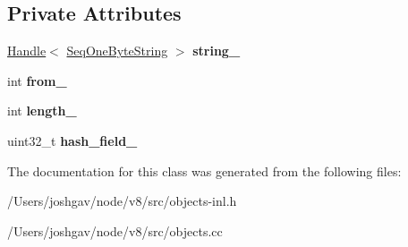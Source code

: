 \subsection*{Private Attributes}
\begin{DoxyCompactItemize}
\item 
\hyperlink{classv8_1_1internal_1_1_handle}{Handle}$<$ \hyperlink{classv8_1_1internal_1_1_seq_one_byte_string}{Seq\+One\+Byte\+String} $>$ {\bfseries string\+\_\+}\hypertarget{classv8_1_1internal_1_1_seq_one_byte_sub_string_key_a38f0b8d9a40194fb7730d05659f8129a}{}\label{classv8_1_1internal_1_1_seq_one_byte_sub_string_key_a38f0b8d9a40194fb7730d05659f8129a}

\item 
int {\bfseries from\+\_\+}\hypertarget{classv8_1_1internal_1_1_seq_one_byte_sub_string_key_aeb2345eb478bebda7102ece402c0a119}{}\label{classv8_1_1internal_1_1_seq_one_byte_sub_string_key_aeb2345eb478bebda7102ece402c0a119}

\item 
int {\bfseries length\+\_\+}\hypertarget{classv8_1_1internal_1_1_seq_one_byte_sub_string_key_a0451a59e42ffe835ab6cb6b6e355f93a}{}\label{classv8_1_1internal_1_1_seq_one_byte_sub_string_key_a0451a59e42ffe835ab6cb6b6e355f93a}

\item 
uint32\+\_\+t {\bfseries hash\+\_\+field\+\_\+}\hypertarget{classv8_1_1internal_1_1_seq_one_byte_sub_string_key_a210c86e69cec8b23b921000dd96441b4}{}\label{classv8_1_1internal_1_1_seq_one_byte_sub_string_key_a210c86e69cec8b23b921000dd96441b4}

\end{DoxyCompactItemize}


The documentation for this class was generated from the following files\+:\begin{DoxyCompactItemize}
\item 
/\+Users/joshgav/node/v8/src/objects-\/inl.\+h\item 
/\+Users/joshgav/node/v8/src/objects.\+cc\end{DoxyCompactItemize}
